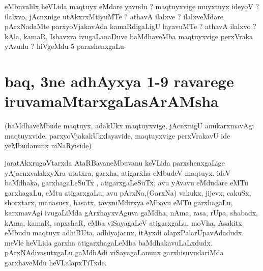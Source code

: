 \begin{artha}
eMbuvalilx heVLida maqtuyx eMdare yavudu ? maqtuyxvige muyxtuyx ideyoV ? ilalxvo, jAcnxnige  utAkxrxMtiyuMTe ? athavA ilalxve ? ilalxveMdare pArxNadaMte parxyoVjakavAda kamaRdigaLigU layavuMTe ? athavA ilalxvo ? kAla, kamaR, Ishavxra ivugaLanaDuve baMdhaveMba maqtuyxvige perxVraka yAvudu ? hiVgeMdu 5 parxshenxgaLu-
\end{artha}


\section*{baq, 3ne adhAyxya 1-9 ravarege iruvamaMtarxgaLasArAMsha}

\begin{artha}
(baMdhaveMbude maqtuyx, adakUkx maqtuyxvige, jAcnxnigU anukarxmavAgi maqtuyxvide, parxyoVjakakUkxlayavide, maqtuyxvige perxVrakavU ide yeMbudanunx niNaRyiside)

jaratAkxrugoVtarxda AtaRBavaneMbuvanu keVLida parxshenxgaLige yAjacnxvalakxyXra utatxra, garxha, atigarxha eMbudeV maqtuyx. ideV baMdhaka, garxhagaLeSuTx , atigarxgaLeSuTx, avu yAvavu eMdudare eMTu garxhagaLu, eMtu atigarxgaLu, avu pArxNa,(GarxNa) vakukx, jijevx, cakuSx, shorxtarx, manasusx, hasatx, tavxniMdirxya eMbavu eMTu garxhagaLu, karxmavAgi ivugaLiMda gArxhayxvAguva gaMdha, nAma, rasa, rUpa, shabadx, kAma, kamaR, sapxshaR, eMba viSayagaLeV atigarxgaLu, moVha, Asakitx eMbudu maqtuyx adhiBUta, adhiyajacnx, itAyxdi alapxPalarUpavAdadudx. meVle heVLida garxha atigarxhagaLeMba baMdhakavuLaLxdudx. pArxNAdivasutxgaLu gaMdhAdi viSayagaLanunx garxhisuvudariMda garxhaveMdu heVLalapxTiTxde.
\end{artha}
